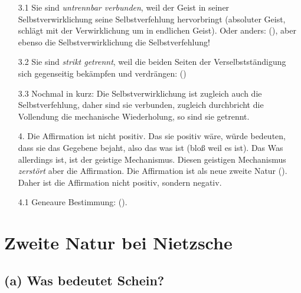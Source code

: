 \documentclass[12pt, a4paper, openany]{report}
\begin{document}
\begin{itemize}
    \item[3.1] Sie sind \emph{untrennbar verbunden}, weil der Geist in seiner Selbstverwirklichung seine Selbstverfehlung hervorbringt (absoluter Geist, schlägt mit der Verwirklichung um in endlichen Geist).
    Oder anders:  (\cite[][147]{menke_autonomie_2018}), aber ebenso die Selbstverwirklichung die Selbstverfehlung! 
    \item[3.2] Sie sind \emph{strikt getrennt}, weil die beiden Seiten der Verselbstständigung sich gegenseitig bekämpfen und verdrängen:  (\cite[][147]{menke_autonomie_2018}) 
    \item[3.3] Nochmal in kurz: Die Selbstverwirklichung ist zugleich auch die Selbstverfehlung, daher sind sie verbunden, zugleich durchbricht die Vollendung die mechanische Wiederholung, so sind sie getrennt.
    \item[4.] Die Affirmation ist nicht positiv. 
        Das sie positiv wäre, würde bedeuten, dass sie das Gegebene bejaht, also das was ist (bloß weil es ist). 
        Das Was allerdings ist, ist der geistige Mechanismus.
        Diesen geistigen Mechanismus \emph{zerstört} aber die Affirmation. 
        Die Affirmation ist als neue zweite Natur  (\cite[][148]{menke_autonomie_2018}).
        Daher ist die Affirmation nicht positiv, sondern negativ.
    \item[4.1] Geneaure Bestimmung:  (\cite[][148]{menke_autonomie_2018}).
\end{itemize}

\section{Zweite Natur bei Nietzsche}\label{abschnitt_2}

\subsection{(a) Was bedeutet Schein?}
\end{document}
